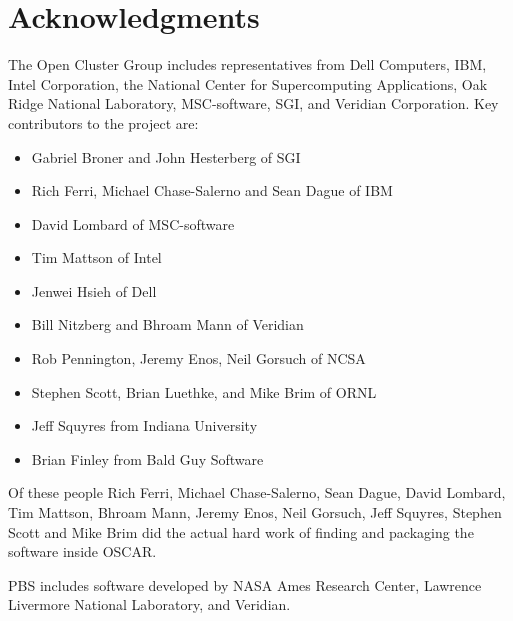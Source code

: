 \documentclass[letterpaper,11pt]{article}
\begin{document}
\section{Acknowledgments}
The Open Cluster Group includes representatives from Dell Computers,
IBM, Intel Corporation, the National Center for Supercomputing
Applications, Oak Ridge National Laboratory, MSC-software, SGI, and
Veridian Corporation.  Key contributors to the project are:
\begin{itemize}
        \item Gabriel Broner and John Hesterberg of SGI

        \item Rich Ferri, Michael Chase-Salerno and Sean Dague of IBM

        \item David Lombard of MSC-software

        \item Tim Mattson of Intel

        \item Jenwei Hsieh of Dell

        \item Bill Nitzberg and Bhroam Mann of Veridian

        \item Rob Pennington, Jeremy Enos, Neil Gorsuch of NCSA
        
        \item Stephen Scott, Brian Luethke, and Mike Brim of ORNL

        \item Jeff Squyres from Indiana University

        \item Brian Finley from Bald Guy Software
\end{itemize}
\noindent Of these people Rich Ferri, Michael Chase-Salerno, Sean Dague,
David Lombard, Tim Mattson, Bhroam Mann, Jeremy Enos, Neil Gorsuch, Jeff
Squyres, Stephen Scott and Mike Brim did the actual hard work of
finding and packaging the software inside OSCAR.

PBS includes software developed by NASA Ames Research Center, Lawrence
Livermore National Laboratory, and Veridian.




\appendix

\ \\
\end{document}
